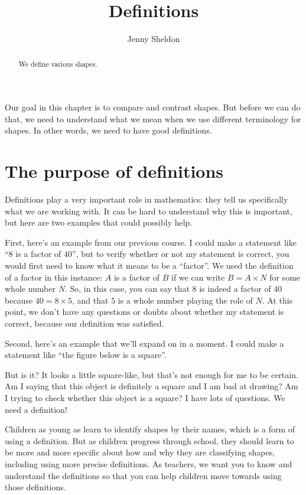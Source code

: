 \documentclass{ximera}
\title{Definitions}
\author{Jenny Sheldon}
\begin{document}
\begin{abstract}
We define various shapes.
\end{abstract}
\maketitle

Our goal in this chapter is to compare and contrast shapes. But before we can do that, we need to understand what we mean when we use different terminology for shapes. In other words, we need to have good definitions.

\section{The purpose of definitions}

Definitions play a very important role in mathematics: they tell us specifically what we are working with. It can be hard to understand why this is important, but here are two examples that could possibly help.

First, here's an example from our previous course. I could make a statement like ``$8$ is a factor of $40$'', but to verify whether or not my statement is correct, you would first need to know what it means to be a ``factor''. We used the definition of a factor in this instance: $A$ is a factor of $B$ if we can write $B = A \times N$ for some whole number $N$. So, in this case, you can say that $8$ is indeed a factor of $40$ because $40 = 8 \times 5$, and that $5$ is a whole number playing the role of $N$. At this point, we don't have any questions or doubts about whether my statement is correct, because our definition was satisfied.

Second, here's an example that we'll expand on in a moment. I could make a statement like ``the figure below is a square''.
\begin{image}
\end{image}
But is it? It looks a little square-like, but that's not enough for me to be certain. Am I saying that this object is definitely a square and I am bad at drawing? Am I trying to check whether this object is a square? I have lots of questions. We need a definition!

Children as young as  learn to identify shapes by their names, which is a form of using a definition. But as children progress through school, they should learn to be more and more specific about how and why they are classifying shapes, including using more precise definitions. As teachers, we want you to know and understand the definitions so that you can help children move towards using those definitions.
\end{document}

